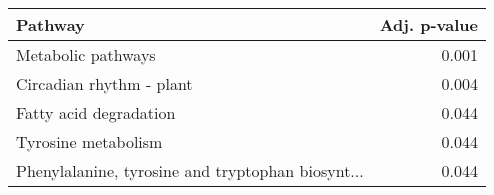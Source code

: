 \begin{tabular}{lr}
\toprule
                                           Pathway &  Adj. p-value \\
\midrule
                                Metabolic pathways &         0.001 \\
                          Circadian rhythm - plant &         0.004 \\
                            Fatty acid degradation &         0.044 \\
                               Tyrosine metabolism &         0.044 \\
 Phenylalanine, tyrosine and tryptophan biosynt... &         0.044 \\
\bottomrule
\end{tabular}
